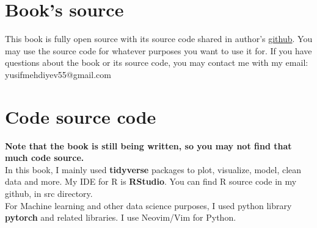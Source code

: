 \section*{Book's source}
This book is fully open source with its source code shared in author's \href{https://github.com/JosephMehdiyev}{github}. You may use the source code for whatever purposes you want to use it for. If you have questions about the book or its source code, you may contact me with my email: yusifmehdiyev55@gmail.com 


\section*{Code source code}
\textbf{Note that the book is still being written, so you may not find that much code source.}\\
In this book, I mainly used \textbf{tidyverse} packages to plot, visualize, model, clean data and more. My IDE for R is \textbf{RStudio}. You can find R source code in my github, in src directory.
\\
For Machine learning and other data science purposes, I used python library \textbf{pytorch} and related libraries. I use Neovim/Vim for Python.
